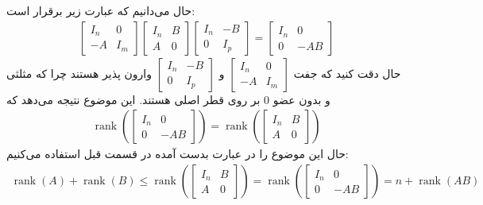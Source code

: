 حال می‌دانیم که عبارت زیر برقرار است:
\begin{gather*}
    \begin{bmatrix}
        I_n & 0\\
        -A & I_m
    \end{bmatrix}
    \begin{bmatrix}
        I_n & B\\
        A & 0
    \end{bmatrix}
    \begin{bmatrix}
        I_n & -B\\
        0 & I_p
    \end{bmatrix}
    =
    \begin{bmatrix}
        I_n & 0\\
        0 & -AB
    \end{bmatrix}
\end{gather*}
حال دقت کنید که جفت
$\begin{bmatrix}
    I_n & 0\\
    -A & I_m
\end{bmatrix}$
و
$\begin{bmatrix}
    I_n & -B\\
    0 & I_p
\end{bmatrix}$
وارون پذیر هستند چرا که مثلثی و بدون عضو 0 بر روی قطر اصلی هستند.
این موضوع نتیجه می‌دهد که
\begin{gather*}
    \operatorname{rank}(\begin{bmatrix}
        I_n & 0\\
        0 & -AB
    \end{bmatrix})
    =
    \operatorname{rank}(\begin{bmatrix}
        I_n & B\\
        A & 0
    \end{bmatrix})
\end{gather*}
حال این موضوع را در عبارت بدست آمده در قسمت قبل استفاده می‌کنیم:
\begin{gather*}
    \operatorname{rank}(A) + \operatorname{rank}(B) \leq \operatorname{rank}(
    \begin{bmatrix}
        I_n & B \\
        A & 0
    \end{bmatrix}) = 
    \operatorname{rank}(\begin{bmatrix}
        I_n & 0\\
        0 & -AB
    \end{bmatrix})
    = n + \operatorname{rank}(AB)
\end{gather*}

